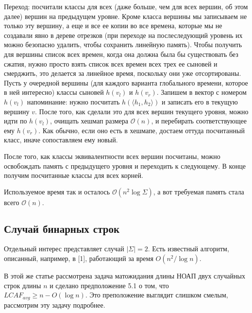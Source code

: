 Переход: посчитали классы для всех (даже больше, чем для всех вершин, об этом далее) вершин на предыдущем уровне. Кроме класса вершины мы записываем не только эту вершину, а еще и все ее копии во все времена, которые мы не создавали явно в дереве отрезков (при переходе на послеследующий уровень их можно безопасно удалить, чтобы сохранить линейную память). Чтобы получить для вершины список всех времен, когда она должна была бы существовать без сжатия, нужно просто взять список всех времен всех трех ее сыновей и смерджить, это делается за линейное время, поскольку они уже отсортированы. Пусть у очередной вершины (для каждого варианта глобального времени, которое в ней интересно) классы сыновей $h(v_l)$ и $h(v_r)$. Запишем в вектор с номером $h(v_l)$ напоминание: нужно посчитать $h(\langle h_1, h_2 \rangle)$ и записать его в текущую вершину $v$. После того, как сделали это для всех вершин текущего уровня, можно идти по $h(v_l)$, очищать хешмап размера $\mathcal{O}(n)$, и перебирать соответствующее ему $h(v_r)$. Как обычно, если оно есть в хешмапе, достаем оттуда посчитанный класс, иначе сопоставляем ему новый. 

После того, как классы эквивалентности всех вершин посчитаны, можно освобождать память с предыдущего уровня и переходить к следующему. В конце получим посчитанные классы для всех корней.

Используемое время так и осталось $\mathcal{O}(n^2 \log \Sigma)$, а вот требуемая память стала всего $\mathcal{O}(n)$.


\subsection{Случай бинарных строк}
Отдельный интерес представляет случай $|\Sigma|=2$. Есть известный алгоритм, описанный, например, в [1], работающий за время $O(n^2/\log n)$.

В этой же статье рассмотрена задача матожидания длины НОАП двух случайных строк длины $n$ и сделано предположение 5.1 о том, что $LCAF_{avg} \ge n - O(\log n)$. Это преположение выглядит слишком смелым, рассмотрим эту задачу подробнее.



